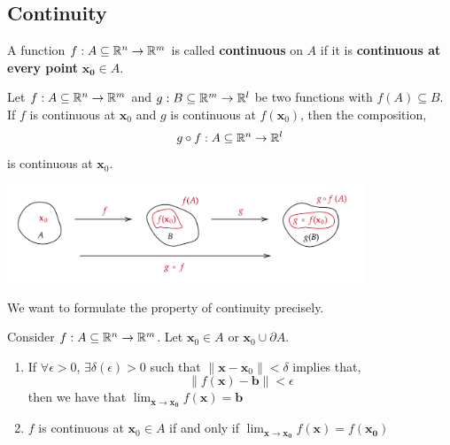 \subsection{Continuity}
\begin{defn}[Continuity]
    A function $f: A \subseteq \mathbb{R}^n \rightarrow \mathbb{R}^m$ is called \textbf{continuous} on $A$ if it is \textbf{continuous at every point} $\mathbf{x_0} \in A$.
\end{defn}

\begin{thm}
    Let $f: A \subseteq \mathbb{R}^n \rightarrow \mathbb{R}^m$ and $g: B \subseteq \mathbb{R}^m \rightarrow \mathbb{R}^l$ be two functions with $f(A) \subseteq B$. If $f$ is continuous at $\mathbf{x}_0$ and  $g$ is continuous at $f(\mathbf{x}_0)$, then the composition,
    \[g \circ f : A \subseteq \mathbb{R}^n \rightarrow \mathbb{R}^l\]
    is continuous at $\mathbf{x}_0$.
\end{thm}

\begin{center}
       \includegraphics[width=0.8\textwidth]{figures/wk-1/fig-20.png}
\end{center}

\noindent We want to formulate the property of continuity precisely.

\begin{thm}
    Consider $f: A \subseteq \mathbb{R}^n \rightarrow \mathbb{R}^m$. Let $\mathbf{x}_0 \in A$ or $\mathbf{x}_0 \cup \partial A$.
    \begin{enumerate}
        \item If $\forall \epsilon > 0$, $\exists \delta(\epsilon) > 0$ such that $\|\mathbf{x} - \mathbf{x}_0\| < \delta$ implies that,
        \[\|f(\mathbf{x}) - \mathbf{b}\| < \epsilon\]
        then we have that  $\lim_{\mathbf{x} \rightarrow \mathbf{x_0}} f(\mathbf{x})= \mathbf{b}$
        \item $f$ is continuous at $\mathbf{x}_0 \in A$ if and only if  $\lim_{\mathbf{x} \rightarrow \mathbf{x_0}} f(\mathbf{x})= f(\mathbf{x_0})$
        
    \end{enumerate}
\end{thm}


